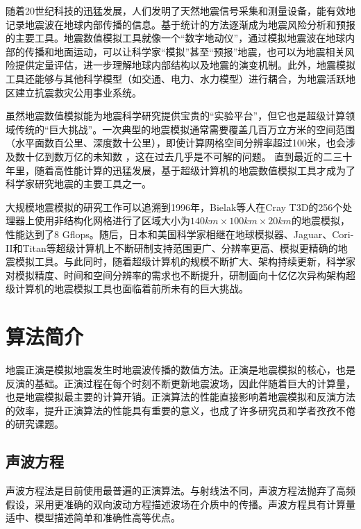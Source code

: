 \documentclass[degree=doctor]{thuthesis}
\begin{document}
随着20世纪科技的迅猛发展，人们发明了天然地震信号采集和测量设备，能有效地记录地震波在地球内部传播的信息。基于统计的方法逐渐成为地震风险分析和预报的主要工具。地震数值模拟工具就像一个“数字地动仪”，通过模拟地震波在地球内部的传播和地面运动，可以让科学家“模拟”甚至“预报”地震，也可以为地震相关风险提供定量评估，进一步理解地球内部结构以及地震的演变机制。此外，地震模拟工具还能够与其他科学模型（如交通、电力、水力模型）进行耦合，为地震活跃地区建立抗震救灾公用事业系统。

虽然地震数值模拟能为地震科学研究提供宝贵的“实验平台”，但它也是超级计算领域传统的“巨大挑战”。一次典型的地震模拟通常需要覆盖几百万立方米的空间范围（水平面数百公里、深度数十公里），即使计算网格空间分辨率超过100米，也会涉及数十亿到数万亿的未知数 \citep{cui2010scalable}，这在过去几乎是不可解的问题。 直到最近的二三十年里，随着高性能计算的迅猛发展，基于超级计算机的地震数值模拟工具才成为了科学家研究地震的主要工具之一。

大规模地震模拟的研究工作可以追溯到1996年，Bielak等人在Cray T3D的256个处理器上使用非结构化网格进行了区域大小为$140km \times 100km \times 20km$的地震模拟\citep{bao1996earthquake}，性能达到了8 Gflops。随后，日本和美国科学家相继在地球模拟器\cite{chen2006glueball}、Jaguar\cite{carrington2008high}、Cori-II\citep{breuer2017edge}和Titan\cite{cui2013physics}等超级计算机上不断研制支持范围更广、分辨率更高、模拟更精确的地震模拟工具。与此同时，随着超级计算机的规模不断扩大、架构持续更新，科学家对模拟精度、时间和空间分辨率的需求也不断提升，研制面向十亿亿次异构架构超级计算机的地震模拟工具也面临着前所未有的巨大挑战。

\chapter{算法简介}
地震正演是模拟地震发生时地震波传播的数值方法。正演是地震模拟的核心，也是反演的基础。正演过程在每个时刻不断更新地震波场，因此伴随着巨大的计算量，也是地震模拟最主要的计算开销。正演算法的性能直接影响着地震模拟和反演方法的效率，提升正演算法的性能具有重要的意义，也成了许多研究员和学者孜孜不倦的研究课题\cite{bednar2002limited,stork2013eliminating}。

\section{声波方程} %
声波方程法是目前使用最普遍的正演算法。与射线法不同，声波方程法抛弃了高频假设，采用更准确的双向波动方程描述波场在介质中的传播。声波方程具有计算量适中、模型描述简单和准确性高等优点。
\end{document}
